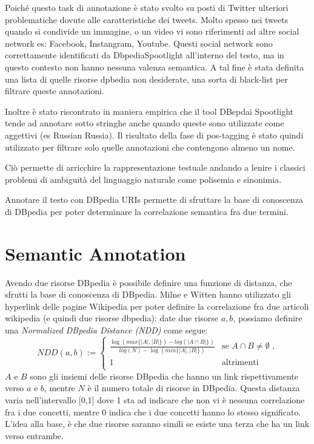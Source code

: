 Poiché questo task di annotazione è stato svolto su posti di Twitter  ulteriori problematiche dovute alle caratteristiche dei tweets.
Molto spesso nei tweets quando si condivide un immagine, o un video vi sono riferimenti ad altre social network es: Facebook, Instangram, Youtube.
Questi social network sono correttamente identificati  da DbpediaSpootlight all'interno del testo, ma in questo contesto non hanno nessuna valenza semantica.  A tal fine è stata definita una lista di quelle risorse dpbedia non desiderate, una sorta di black-list per filtrare queste annotazioni.


Inoltre è stato riscontrato in maniera empirica che il tool DBepdai Spootlight tende ad annotare  sotto stringhe anche quando queste sono utilizzate come aggettivi (es Russian   Russia).
Il risultato della fase di pos-tagging è stato quindi utilizzato per filtrare solo quelle annotazioni che contengono almeno un nome. 





 Ciò permette di arricchire la rappresentazione testuale andando a lenire i classici problemi di ambiguità del linguaggio naturale come polisemia e sinonimia.  





Annotare il testo con DBpedia URIs permette di sfruttare la base di conoscenza di DBpedia per poter determinare la correlazione semantica fra due termini. 


 
 

\section{Semantic Annotation}





Avendo due risorse DBpedia è possibile definire una funzione di distanza, che sfrutti la base di conoscenza di DBpedia.  
Milne e Witten \cite{Milne08aneffective} hanno utilizzato gli hyperlink delle pagine Wikipedia per poter definire la correlazione fra due articoli wikipedia (e quindi due risorse dbpedia): date due risorse $a,b$, possiamo definire una \emph{Normalized DBpedia Distance (NDD)} come segue:
\begin{equation} \label{eq:normalized_dbpedia_distance}
NDD(a,b):=\begin{cases}
\frac{\log(max\{|A|,|B|\})-log( |A \cap B|\})}{log(N)-\log(min\{|A|,|B|\})} & \text{se $A \cap B \neq \emptyset $  ,}\\
1 & \text{altrimenti}\\
\end{cases}
\end{equation}
 $A$ e $B$  sono gli insiemi delle risorse DBpedia che hanno un link rispettivamente verso $a$ e $b$, mentre $N$ è il numero totale di risorse in DBpedia. Questa distanza varia nell'intervallo [0,1] dove 1 sta ad indicare che non vi è nessuna correlazione fra i due concetti, mentre 0 indica che i due concetti hanno lo stesso significato. L'idea alla base, è che due risorse saranno simili se esiste una terza che ha un link verso entrambe.
 


